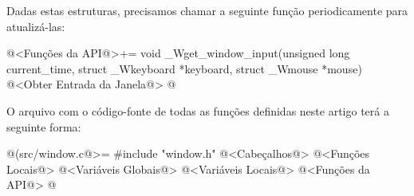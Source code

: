 Dadas estas estruturas, precisamos chamar a seguinte função
periodicamente para atualizá-las:

\iniciocodigo
@<Funções da API@>+=
void _Wget_window_input(unsigned long current_time, struct _Wkeyboard *keyboard,
                        struct _Wmouse *mouse){
  @<Obter Entrada da Janela@>
}
@
\fimcodigo



O arquivo com o código-fonte de todas as funções definidas neste
artigo terá a seguinte forma:

\iniciocodigo
@(src/window.c@>=
#include "window.h"
@<Cabeçalhos@>
@<Funções Locais@>
@<Variáveis Globais@>
@<Variáveis Locais@>
@<Funções da API@>
@
\fimcodigo


\fim
